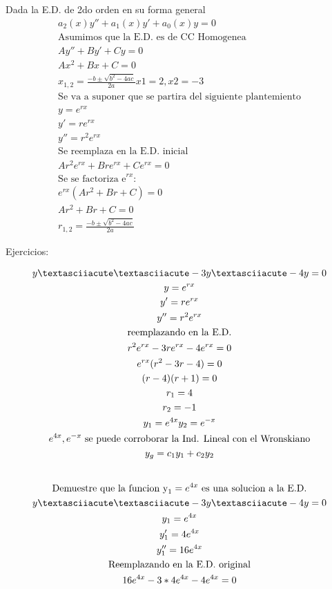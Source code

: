 \documentclass{article}
\begin{document}
Dada la E.D. de 2do orden en su forma general
\begin{gather*}
a_{2}(x)y''+a_{1}(x)y'+a_{0}(x)y = 0 \\
\text{Asumimos que la E.D. es de CC Homogenea} \\
Ay''+By'+Cy=0 \\
Ax^{2}+Bx+C=0 \\
x_{1,2} = \frac{-b±\sqrt{b^{2}-4ac}}{2a}  x1= 2, x2=-3 \\
\text{Se va a suponer que se partira del siguiente plantemiento} \\
y = e^{rx} \\
y' = re^{rx} \\
y'' = r^{2}e^{rx} \\
\text{Se reemplaza en la E.D. inicial} \\
A r^{2}e^{rx}+Bre^{rx}+Ce^{rx}=0 \\
\text{Se se factoriza e}^{rx}: \\
e^{rx}(A r^{2}+Br+C)=0 \\
A r^{2}+Br+C = 0 \\
r_{1,2} = \frac{-b±\sqrt{b^{2}-4ac}}{2a}
\end{gather*}


Ejercicios:


\begin{gather*}
y´´-3y´-4y=0 \\
y = e^{rx} \\
y' = re^{rx} \\
y'' = r^{2}e^{rx} \\
\text{reemplazando en la E.D.} \\
r^{2}e^{rx}-3re^{rx}-4e^{rx}=0 \\
e^{rx}(r^{2}-3r-4)=0 \\
(r-4)(r+1)=0 \\
r_{1} = 4 \\
r_{2} =-1 \\
y_{1}=e^{4x}  y_{2}=e^{-x}  \\
{e^{4x},e^{-x}}\text{ se puede corroborar la Ind. Lineal con el Wronskiano} \\
y_{g} = c_{1}y_{1}+c_{2}y_{2}  \\
\vspace{0.5em} \\
\text{Demuestre que la funcion y}_{1}=e^{4x}\text{ es una solucion a la E.D.} \\
y´´-3y´-4y=0 \\
y_{1}=e^{4x} \\
y'_{1}=4e^{4x} \\
y''_{1}=16e^{4x} \\
\text{Reemplazando en la E.D. original} \\
16e^{4x}-3*4e^{4x}-4e^{4x}=0
\end{gather*}
\end{document}
